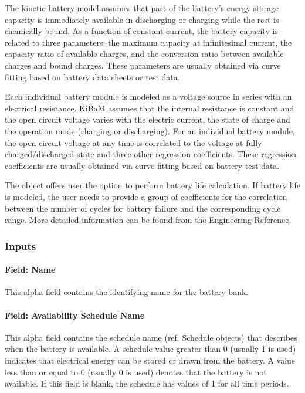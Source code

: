The kinetic battery model assumes that part of the battery's energy storage capacity is immediately available in discharging or charging while the rest is chemically bound. As a function of constant current, the battery capacity is related to three parameters: the maximum capacity at infinitesimal current, the capacity ratio of available charges, and the conversion ratio between available charges and bound charges. These parameters are usually obtained via curve fitting based on battery data sheets or test data.

Each individual battery module is modeled as a voltage source in series with an electrical resistance. KiBaM assumes that the internal resistance is constant and the open circuit voltage varies with the electric current, the state of charge and the operation mode (charging or discharging). For an individual battery module, the open circuit voltage at any time is correlated to the voltage at fully charged/discharged state and three other regression coefficients. These regression coefficients are usually obtained via curve fitting based on battery test data.

The object offers user the option to perform battery life calculation. If battery life is modeled, the user needs to provide a group of coefficients for the correlation between the number of cycles for battery failure and the corresponding cycle range. More detailed information can be found from the Engineering Reference.

\subsubsection{Inputs}

\paragraph{Field: Name}\label{field-name-7-004}

This alpha field contains the identifying name for the battery bank.

\paragraph{Field: Availability Schedule Name}\label{field-availability-schedule-name-6-000}

This alpha field contains the schedule name (ref. Schedule objects) that describes when the battery is available. A schedule value greater than 0 (usually 1 is used) indicates that electrical energy can be stored or drawn from the battery. A value less than or equal to 0 (usually 0 is used) denotes that the battery is not available. If this field is blank, the schedule has values of 1 for all time periods.

